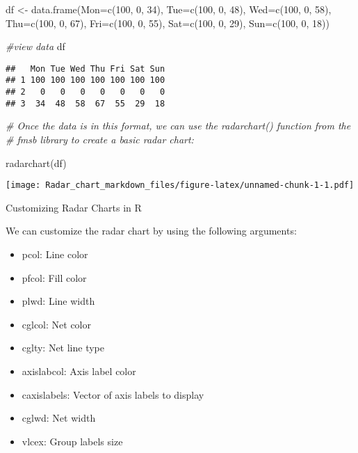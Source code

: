 \documentclass[
]{article}
\newenvironment{Shaded}{\begin{snugshade}}{\end{snugshade}}
\newcommand{\AttributeTok}[1]{\textcolor[rgb]{0.77,0.63,0.00}{#1}}
\newcommand{\CommentTok}[1]{\textcolor[rgb]{0.56,0.35,0.01}{\textit{#1}}}
\newcommand{\DecValTok}[1]{\textcolor[rgb]{0.00,0.00,0.81}{#1}}
\newcommand{\FunctionTok}[1]{\textcolor[rgb]{0.00,0.00,0.00}{#1}}
\newcommand{\NormalTok}[1]{#1}
\newcommand{\OtherTok}[1]{\textcolor[rgb]{0.56,0.35,0.01}{#1}}
\providecommand{\tightlist}{%
  \setlength{\itemsep}{0pt}\setlength{\parskip}{0pt}}
\begin{document}
\begin{Shaded}
\begin{Highlighting}[]
\NormalTok{df }\OtherTok{\textless{}{-}} \FunctionTok{data.frame}\NormalTok{(}\AttributeTok{Mon=}\FunctionTok{c}\NormalTok{(}\DecValTok{100}\NormalTok{, }\DecValTok{0}\NormalTok{, }\DecValTok{34}\NormalTok{),}
                 \AttributeTok{Tue=}\FunctionTok{c}\NormalTok{(}\DecValTok{100}\NormalTok{, }\DecValTok{0}\NormalTok{, }\DecValTok{48}\NormalTok{),}
                 \AttributeTok{Wed=}\FunctionTok{c}\NormalTok{(}\DecValTok{100}\NormalTok{, }\DecValTok{0}\NormalTok{, }\DecValTok{58}\NormalTok{),}
                 \AttributeTok{Thu=}\FunctionTok{c}\NormalTok{(}\DecValTok{100}\NormalTok{, }\DecValTok{0}\NormalTok{, }\DecValTok{67}\NormalTok{),}
                 \AttributeTok{Fri=}\FunctionTok{c}\NormalTok{(}\DecValTok{100}\NormalTok{, }\DecValTok{0}\NormalTok{, }\DecValTok{55}\NormalTok{),}
                 \AttributeTok{Sat=}\FunctionTok{c}\NormalTok{(}\DecValTok{100}\NormalTok{, }\DecValTok{0}\NormalTok{, }\DecValTok{29}\NormalTok{),}
                 \AttributeTok{Sun=}\FunctionTok{c}\NormalTok{(}\DecValTok{100}\NormalTok{, }\DecValTok{0}\NormalTok{, }\DecValTok{18}\NormalTok{))}

\CommentTok{\#view data}
\NormalTok{df}
\end{Highlighting}
\end{Shaded}

\begin{verbatim}
##   Mon Tue Wed Thu Fri Sat Sun
## 1 100 100 100 100 100 100 100
## 2   0   0   0   0   0   0   0
## 3  34  48  58  67  55  29  18
\end{verbatim}

\begin{Shaded}
\begin{Highlighting}[]
\CommentTok{\# Once the data is in this format, we can use the radarchart() function from the }
\CommentTok{\# fmsb library to create a basic radar chart:}


\FunctionTok{radarchart}\NormalTok{(df)}
\end{Highlighting}
\end{Shaded}

\texttt{[image: Radar\_chart\_markdown\_files/figure-latex/unnamed-chunk-1-1.pdf]}

Customizing Radar Charts in R

We can customize the radar chart by using the following arguments:

\begin{itemize}
\tightlist
\item
  pcol: Line color
\item
  pfcol: Fill color
\item
  plwd: Line width
\item
  cglcol: Net color
\item
  cglty: Net line type
\item
  axislabcol: Axis label color
\item
  caxislabels: Vector of axis labels to display
\item
  cglwd: Net width
\item
  vlcex: Group labels size
\end{itemize}
\end{document}

